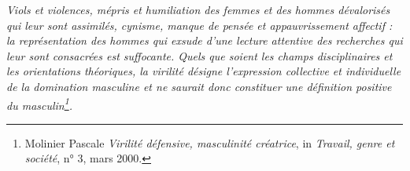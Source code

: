  \emph{Viols et violences, mépris et humiliation des femmes et des hommes dévalorisés qui leur sont assimilés, cynisme, manque de pensée et appauvrissement affectif : la représentation des hommes qui exsude d'une lecture attentive des recherches qui leur sont consacrées est suffocante. Quels que soient les champs disciplinaires et les orientations théoriques, la virilité désigne l'expression collective et individuelle de la domination masculine et ne saurait donc constituer une définition positive du masculin\footnote{Molinier Pascale \emph{Virilité défensive, masculinité créatrice}, in  \emph{Travail, genre et société}, n° 3, mars 2000.}.}



 



